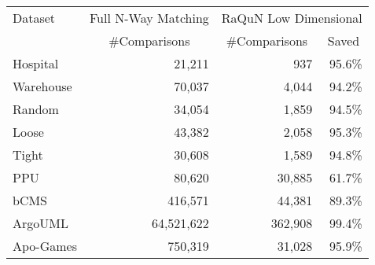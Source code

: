 \begin{tabular}{  l  c  c  c }
\hline
Dataset & \multicolumn{1}{c}{Full N-Way Matching} & \multicolumn{2}{c}{RaQuN Low Dimensional} \\
 & \#Comparisons &  \#Comparisons & Saved \\
\hline
Hospital & \multicolumn{1}{r}{21,211 } & \multicolumn{1}{r}{937 } & \multicolumn{1}{r}{95.6\% } \\
Warehouse & \multicolumn{1}{r}{70,037 } & \multicolumn{1}{r}{4,044 } & \multicolumn{1}{r}{94.2\% } \\
Random & \multicolumn{1}{r}{34,054 } & \multicolumn{1}{r}{1,859 } & \multicolumn{1}{r}{94.5\% } \\
Loose & \multicolumn{1}{r}{43,382 } & \multicolumn{1}{r}{2,058 } & \multicolumn{1}{r}{95.3\% } \\
Tight & \multicolumn{1}{r}{30,608 } & \multicolumn{1}{r}{1,589 } & \multicolumn{1}{r}{94.8\% } \\
PPU & \multicolumn{1}{r}{80,620 } & \multicolumn{1}{r}{30,885 } & \multicolumn{1}{r}{61.7\% } \\
bCMS & \multicolumn{1}{r}{416,571 } & \multicolumn{1}{r}{44,381 } & \multicolumn{1}{r}{89.3\% } \\
ArgoUML & \multicolumn{1}{r}{64,521,622 } & \multicolumn{1}{r}{362,908 } & \multicolumn{1}{r}{99.4\% } \\
Apo-Games & \multicolumn{1}{r}{750,319 } & \multicolumn{1}{r}{31,028 } & \multicolumn{1}{r}{95.9\% } \\
\hline
\end{tabular}
